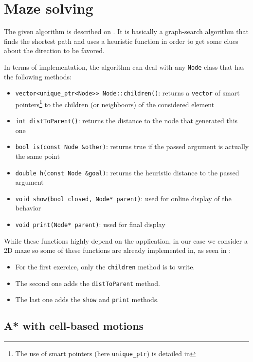 \documentclass{ecnreport}
\begin{document}
\section{Maze solving}

The given algorithm is described on . It is basically a graph-search algorithm that
finds the shortest path and uses a heuristic function in order to get some clues about the direction to be favored.

In terms of implementation, the algorithm can deal with any \texttt{Node} class that has the following methods:
\begin{itemize}
 \item \texttt{vector<unique\_ptr<Node>> Node::children()}: returns a \texttt{vector} of smart pointers\footnote{The use of smart pointers (here \texttt{unique\_ptr}) is detailed in } to the children (or neighboors) of the considered
 element
 \item \texttt{int distToParent()}: returns the distance to the node that generated this one
 \item \texttt{bool is(const Node \&other)}: returns true if the passed argument is actually the same point
 \item \texttt{double h(const Node \&goal)}: returns the heuristic distance to the passed argument
 \item \texttt{void show(bool closed, Node* parent)}: used for online display of the behavior
 \item \texttt{void print(Node* parent)}: used for final display
\end{itemize}


While these functions highly depend on the application, in our case we consider a 2D maze so some of these functions are already implemented in, as seen in :
\begin{itemize}
 \item For the first exercice, only the \texttt{children} method is to write.
 \item The second one adds the \texttt{distToParent} method.
 \item The last one adds the \texttt{show} and \texttt{print} methods.
\end{itemize}



\subsection{A* with cell-based motions}
\end{document}
